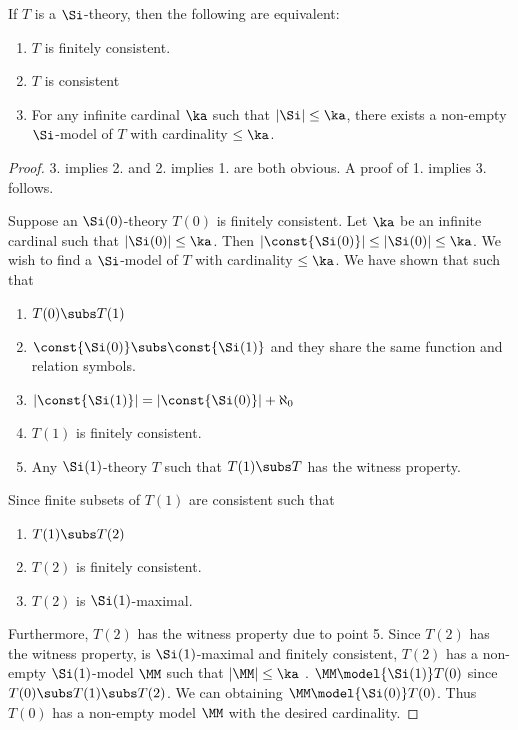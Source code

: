 \begin{prop}
    If $T$ is a $\Si$-theory, 
    then the following are equivalent:
    \begin{enumerate}
        \item $T$ is finitely consistent.
        \item $T$ is consistent
        \item For any infinite cardinal $\ka$ 
        such that $|\Si| \leq \ka$, 
        there exists a non-empty $\Si$-model of 
        $T$ with cardinality $\leq \ka$.
    \end{enumerate}
\end{prop}
\begin{proof}
    3. implies 2. and 2. implies 1. are both obvious. 
    A proof of 1. implies 3. follows.

    Suppose an
    $\Si(0)$-theory $T(0)$ is finitely consistent.
    Let $\ka$ be an infinite cardinal such that 
    $|\Si(0)| \leq \ka$. Then
    $|\const{\Si(0)}| \leq |\Si(0)| \leq \ka$.
    We wish to find a $\Si$-model of $T$ with cardinality $\leq \ka$.
    We have shown that  such that 
    \begin{enumerate}
        \item $T(0) \subs T(1)$
        \item $\const{\Si(0)} \subs \const{\Si(1)}$
        and they share the same function and relation symbols.
        \item $|\const{\Si(1)}| = |\const{\Si(0)}| + \aleph_0$
        \item $T(1)$ is finitely consistent.
        \item Any $\Si(1)$-theory $T$ such that $T(1) \subs T$ 
        has the witness property.
    \end{enumerate}
    Since finite subsets of $T(1)$ are consistent
     such that 
    \begin{enumerate}[resume]
        \item $T(1) \subs T(2)$
        \item $T(2)$ is finitely consistent.
        \item $T(2)$ is $\Si(1)$-maximal.
    \end{enumerate}
    Furthermore, $T(2)$ has the witness property due to point 5.
    Since $T(2)$ has the witness property, is $\Si(1)$-maximal
    and finitely consistent,
    $T(2)$ has a non-empty $\Si(1)$-model $\MM$ such that $|\MM| \leq \ka$
    .
    $\MM \model{\Si(1)} T(0)$ since $T(0) \subs T(1) \subs T(2)$.
    We can 
    obtaining $\MM \model{\Si(0)} T(0)$.
    Thus $T(0)$ has a non-empty model $\MM$ with the desired cardinality.
\end{proof}